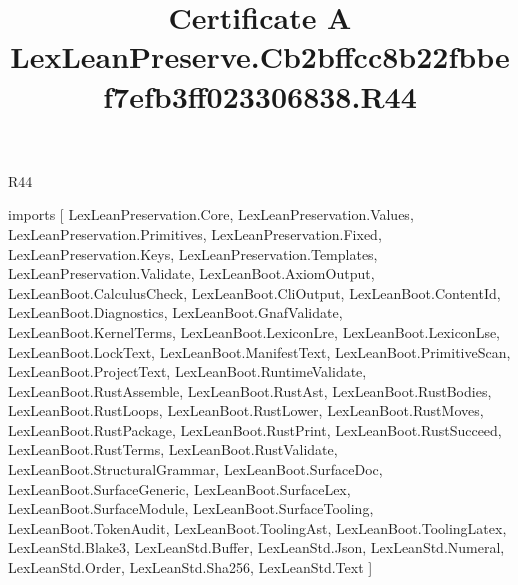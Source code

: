 \begin{lexlean}{R44}
\title{Certificate A LexLeanPreserve.Cb2bffcc8b22fbbef7efb3ff023306838.R44}
\begin{coremodule}
imports [
  LexLeanPreservation.Core,
  LexLeanPreservation.Values,
  LexLeanPreservation.Primitives,
  LexLeanPreservation.Fixed,
  LexLeanPreservation.Keys,
  LexLeanPreservation.Templates,
  LexLeanPreservation.Validate,
  LexLeanBoot.AxiomOutput,
  LexLeanBoot.CalculusCheck,
  LexLeanBoot.CliOutput,
  LexLeanBoot.ContentId,
  LexLeanBoot.Diagnostics,
  LexLeanBoot.GnafValidate,
  LexLeanBoot.KernelTerms,
  LexLeanBoot.LexiconLre,
  LexLeanBoot.LexiconLse,
  LexLeanBoot.LockText,
  LexLeanBoot.ManifestText,
  LexLeanBoot.PrimitiveScan,
  LexLeanBoot.ProjectText,
  LexLeanBoot.RuntimeValidate,
  LexLeanBoot.RustAssemble,
  LexLeanBoot.RustAst,
  LexLeanBoot.RustBodies,
  LexLeanBoot.RustLoops,
  LexLeanBoot.RustLower,
  LexLeanBoot.RustMoves,
  LexLeanBoot.RustPackage,
  LexLeanBoot.RustPrint,
  LexLeanBoot.RustSucceed,
  LexLeanBoot.RustTerms,
  LexLeanBoot.RustValidate,
  LexLeanBoot.StructuralGrammar,
  LexLeanBoot.SurfaceDoc,
  LexLeanBoot.SurfaceGeneric,
  LexLeanBoot.SurfaceLex,
  LexLeanBoot.SurfaceModule,
  LexLeanBoot.SurfaceTooling,
  LexLeanBoot.TokenAudit,
  LexLeanBoot.ToolingAst,
  LexLeanBoot.ToolingLatex,
  LexLeanStd.Blake3,
  LexLeanStd.Buffer,
  LexLeanStd.Json,
  LexLeanStd.Numeral,
  LexLeanStd.Order,
  LexLeanStd.Sha256,
  LexLeanStd.Text
]


\end{coremodule}
\end{lexlean}

